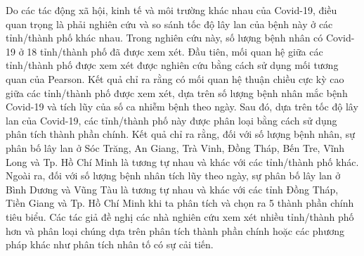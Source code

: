 \documentclass[../thesis.tex]{subfiles}
\begin{document}
Do các tác động xã hội, kinh tế và môi trường khác nhau của Covid-19, điều quan trọng là phải nghiên cứu và so sánh tốc độ lây lan của bệnh này ở các tỉnh/thành phố khác nhau. Trong nghiên cứu này, số lượng bệnh nhân có Covid-19 ở 18 tỉnh/thành phố đã được xem xét. Đầu tiên, mối quan hệ giữa các tỉnh/thành phố được xem xét được nghiên cứu bằng cách sử dụng mối tương quan của Pearson. Kết quả chỉ ra rằng có mối quan hệ thuận chiều cực kỳ cao giữa các tỉnh/thành phố được xem xét, dựa trên số lượng bệnh nhân mắc bệnh Covid-19 và tích lũy của số ca nhiễm bệnh theo ngày. Sau đó, dựa trên tốc độ lây lan của Covid-19, các tỉnh/thành phố này được phân loại bằng cách sử dụng phân tích thành phần chính. Kết quả chỉ ra rằng, đối với số lượng bệnh nhân, sự phân bố lây lan ở Sóc Trăng, An Giang, Trà Vinh, Đồng Tháp, Bến Tre, Vĩnh Long và Tp. Hồ Chí Minh là tương tự nhau và khác với các tỉnh/thành phố khác. Ngoài ra, đối với số lượng bệnh nhân tích lũy theo ngày, sự phân bố lây lan ở Bình Dương và Vũng Tàu là tương tự nhau và khác với các tỉnh Đồng Tháp, Tiền Giang và Tp. Hồ Chí Minh khi ta phân tích và chọn ra 5 thành phần chính tiêu biểu. Các tác giả đề nghị các nhà nghiên cứu xem xét nhiều tỉnh/thành phố hơn và phân loại chúng dựa trên phân tích thành phần chính hoặc các phương pháp khác như phân tích nhân tố có sự cải tiến.
\end{document}
